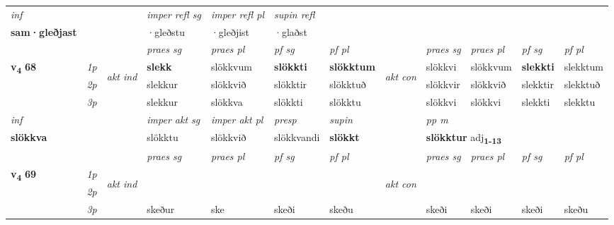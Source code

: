 \begin{longtable}[l]{X>{\footnotesize\itshape}llXXXXlXXXX}
   {\textit{inf}} & &   & \textit{imper refl sg} & \textit{imper refl pl}   & \textit{supin refl}  \\*
  {\textbf{sam\allowbreak ·gleðjast}} & &   & ·gleðstu & ·gleðjist   & ·glaðst  \\*

\midrule

 & &   & \textit{praes sg}  & \textit{praes pl}    & \textit{ pf sg} & \textit{pf pl} & & \textit{praes sg}  & \textit{praes pl}    & \textit{pf sg} & \textit{pf pl }  \\ \cmidrule{4-7} \cmidrule{9-12}
 \multirow{2}{*}{{{\textbf{v{\textsubscript{4}}} \Large{\textbf{68}}}}}  & 1p & \multirow{3}{*}{\begin{turn}{90}\textit{akt ind}\end{turn}} & \textbf{slekk} & slökkvum & \textbf{slökkti} & \textbf{slökktum} & \multirow{3}{*}{\begin{turn}{90}\textit{akt con}\end{turn}} &slökkvi & slökkvum & \textbf{slekkti} & slekktum\\*
 & 2p &  &  slekkur  & slökkvið & slökktir & slökktuð & & slökkvir & slökkvið & slekktir & slekktuð \\*
 & 3p &  & slekkur & slökkva & slökkti & slökktu & & slökkvi & slökkvi& slekkti & slekktu \\*
\cmidrule{4-7} \cmidrule{9-12}

   {\textit{inf}} & &  & \textit{imper akt sg} & \textit{imper akt pl}   & \textit{presp} & \textit{supin}  && \textit{pp m} \\*
  {\textbf{slökkva}} & && slökktu  & slökkvið   & slökkvandi &  \textbf{slökkt}  && \multicolumn{2}{l}{\textbf{slökktur} adj\textbf{\textsubscript{1-13}}} \\*

\midrule

 & &   & \textit{praes sg}  & \textit{praes pl}    & \textit{ pf sg} & \textit{pf pl} & & \textit{praes sg}  & \textit{praes pl}    & \textit{pf sg} & \textit{pf pl }  \\ \cmidrule{4-7} \cmidrule{9-12}
 \multirow{2}{*}{{{\textbf{v{\textsubscript{4}}} \Large{\textbf{69}}}}}  & 1p & \multirow{3}{*}{\begin{turn}{90}\textit{akt ind}\end{turn}} & \textbf{} &  & \textbf{} & \textbf{} & \multirow{3}{*}{\begin{turn}{90}\textit{akt con}\end{turn}} & &  & \textbf{} & \\*
 & 2p &  &    &  &  &  & &  &  &  &  \\*
 & 3p &  & skeður & ske & skeði & skeðu & & skeði & skeði& skeði & skeðu \\*
\cmidrule{4-7} \cmidrule{9-12}


\end{longtable}
